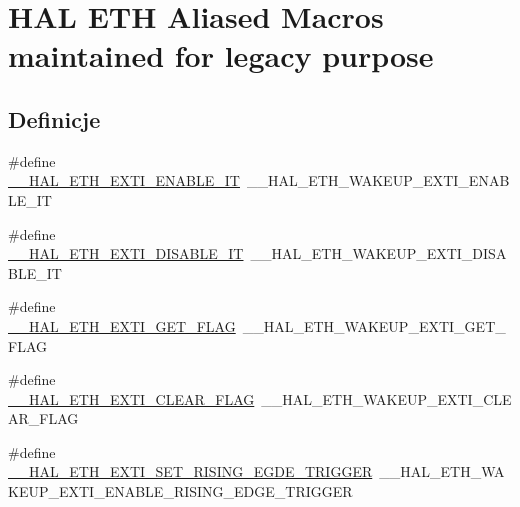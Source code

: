 \hypertarget{group___h_a_l___e_t_h___aliased___macros}{}\section{H\+AL E\+TH Aliased Macros maintained for legacy purpose}
\label{group___h_a_l___e_t_h___aliased___macros}
\subsection*{Definicje}
\begin{DoxyCompactItemize}
\item 
\#define \hyperlink{group___h_a_l___e_t_h___aliased___macros_gad96bacd190bd8ba2523e83be7b1432d8}{\+\_\+\+\_\+\+H\+A\+L\+\_\+\+E\+T\+H\+\_\+\+E\+X\+T\+I\+\_\+\+E\+N\+A\+B\+L\+E\+\_\+\+IT}~\+\_\+\+\_\+\+H\+A\+L\+\_\+\+E\+T\+H\+\_\+\+W\+A\+K\+E\+U\+P\+\_\+\+E\+X\+T\+I\+\_\+\+E\+N\+A\+B\+L\+E\+\_\+\+IT
\item 
\#define \hyperlink{group___h_a_l___e_t_h___aliased___macros_ga2e18c5d21291947835cdefeecdd061ec}{\+\_\+\+\_\+\+H\+A\+L\+\_\+\+E\+T\+H\+\_\+\+E\+X\+T\+I\+\_\+\+D\+I\+S\+A\+B\+L\+E\+\_\+\+IT}~\+\_\+\+\_\+\+H\+A\+L\+\_\+\+E\+T\+H\+\_\+\+W\+A\+K\+E\+U\+P\+\_\+\+E\+X\+T\+I\+\_\+\+D\+I\+S\+A\+B\+L\+E\+\_\+\+IT
\item 
\#define \hyperlink{group___h_a_l___e_t_h___aliased___macros_gab8cb753cb998d6d2d65f2ce0bee7c384}{\+\_\+\+\_\+\+H\+A\+L\+\_\+\+E\+T\+H\+\_\+\+E\+X\+T\+I\+\_\+\+G\+E\+T\+\_\+\+F\+L\+AG}~\+\_\+\+\_\+\+H\+A\+L\+\_\+\+E\+T\+H\+\_\+\+W\+A\+K\+E\+U\+P\+\_\+\+E\+X\+T\+I\+\_\+\+G\+E\+T\+\_\+\+F\+L\+AG
\item 
\#define \hyperlink{group___h_a_l___e_t_h___aliased___macros_ga54ff39d1814de51ec16312fb209f2f41}{\+\_\+\+\_\+\+H\+A\+L\+\_\+\+E\+T\+H\+\_\+\+E\+X\+T\+I\+\_\+\+C\+L\+E\+A\+R\+\_\+\+F\+L\+AG}~\+\_\+\+\_\+\+H\+A\+L\+\_\+\+E\+T\+H\+\_\+\+W\+A\+K\+E\+U\+P\+\_\+\+E\+X\+T\+I\+\_\+\+C\+L\+E\+A\+R\+\_\+\+F\+L\+AG
\item 
\#define \hyperlink{group___h_a_l___e_t_h___aliased___macros_gac2ffccd4ff4dd93383c34465f81969ce}{\+\_\+\+\_\+\+H\+A\+L\+\_\+\+E\+T\+H\+\_\+\+E\+X\+T\+I\+\_\+\+S\+E\+T\+\_\+\+R\+I\+S\+I\+N\+G\+\_\+\+E\+G\+D\+E\+\_\+\+T\+R\+I\+G\+G\+ER}~\+\_\+\+\_\+\+H\+A\+L\+\_\+\+E\+T\+H\+\_\+\+W\+A\+K\+E\+U\+P\+\_\+\+E\+X\+T\+I\+\_\+\+E\+N\+A\+B\+L\+E\+\_\+\+R\+I\+S\+I\+N\+G\+\_\+\+E\+D\+G\+E\+\_\+\+T\+R\+I\+G\+G\+ER
\item 

\end{DoxyCompactItemize}
